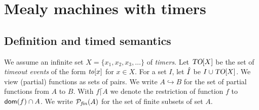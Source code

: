 \section{Mealy machines with timers}

\subsection{Definition and timed semantics}
We assume an infinite set $X = \{ x_1, x_2, x_3,\ldots \}$ of {\em timers}.
Let $\mbox{\sl TO}[X]$ be the set of {\em timeout events} of the form
$\mathit{to}[x]$ for $x \in X$.
For a set $I$, let $\hat{I}$ be $I \cup \mbox{\sl TO}[X]$.
%
We view (partial) functions as sets of pairs.
We write $A \hookrightarrow B$ for the set of partial functions from $A$ to $B$.
With $f \lceil A$ we denote the restriction of function $f$ to ${\textsf{dom}}(f) \cap A$.
We write ${\mathcal{P}}_{\mathit{fin}}(A)$ for the set of finite subsets of set $A$.

